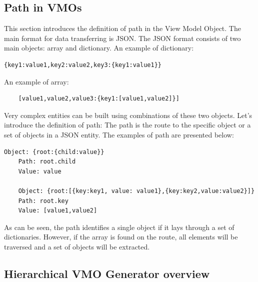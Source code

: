 

\subsection{Path in VMOs}

This section introduces the definition of path in the View Model Object. The main format for data transferring is JSON. The JSON format consists of two main objects: array and dictionary. An example of dictionary:

\lstset{ %
    caption=The example of JSON dictionary,
    basicstyle=\ttfamily\footnotesize\bfseries,
    linewidth=0.6\textwidth
 }
\begin{lstlisting}[linewidth=5cm]
	{key1:value1,key2:value2,key3:{key1:value1}}
\end{lstlisting}

 
An example of array: 

\lstset{ %
    caption=The example of JSON array,
    basicstyle=\ttfamily\footnotesize\bfseries,
    linewidth=0.6\textwidth
 }
\begin{lstlisting}
	[value1,value2,value3:{key1:[value1,value2]}]
\end{lstlisting}

Very complex entities can be built using combinations of these two objects. Let's introduce the definition of path: The path is the route to the specific object or a set of objects in a JSON entity. 
The examples of path are presented below:
\lstset{ %
    caption=The examples of objects in different routes,
    basicstyle=\ttfamily\footnotesize\bfseries,
    linewidth=0.6\textwidth
 }
\begin{lstlisting}[linewidth=5cm]
	Object: {root:{child:value}}
	Path: root.child
	Value: value

	Object: {root:[{key:key1, value: value1},{key:key2,value:value2}]}
	Path: root.key
	Value: [value1,value2]

\end{lstlisting}


As can be seen, the path identifies a single object if it lays through a set of dictionaries. However, if the array is found on the route, all elements will be traversed and a set of objects will be extracted. 


\subsection{Hierarchical VMO Generator overview}


